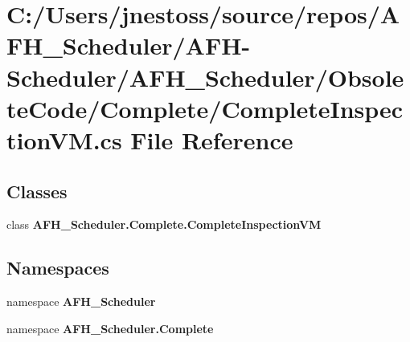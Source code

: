 \section{C\+:/\+Users/jnestoss/source/repos/\+A\+F\+H\+\_\+\+Scheduler/\+A\+F\+H-\/\+Scheduler/\+A\+F\+H\+\_\+\+Scheduler/\+Obsolete\+Code/\+Complete/\+Complete\+Inspection\+VM.cs File Reference}
\label{_complete_inspection_v_m_8cs}
\subsection*{Classes}
\begin{DoxyCompactItemize}
\item 
class \textbf{ A\+F\+H\+\_\+\+Scheduler.\+Complete.\+Complete\+Inspection\+VM}
\end{DoxyCompactItemize}
\subsection*{Namespaces}
\begin{DoxyCompactItemize}
\item 
namespace \textbf{ A\+F\+H\+\_\+\+Scheduler}
\item 
namespace \textbf{ A\+F\+H\+\_\+\+Scheduler.\+Complete}
\end{DoxyCompactItemize}
